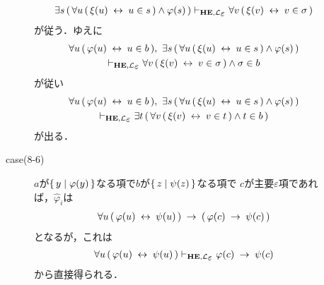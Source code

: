 \begin{metaprf}
\begin{description}
\begin{description}
\begin{align}
							\exists s\, (\, \forall u\, (\, \xi(u) \lrarrow u \in s\, ) \wedge \varphi(s)\, ) 
							\provable{\mbox{{\bf HE}},\lang{\varepsilon}} \forall v\, (\, \xi(v) \lrarrow v \in \sigma\, )
						\end{align}
						が従う．ゆえに
						\begin{align}
							\begin{gathered}
								\forall u\, (\, \varphi(u) \lrarrow u \in b\, ),\ 
								\exists s\, (\, \forall u\, (\, \xi(u) \lrarrow u \in s\, ) \wedge \varphi(s)\, ) \\
								\provable{\mbox{{\bf HE}},\lang{\varepsilon}} \forall v\, (\, \xi(v) \lrarrow v \in \sigma\, ) \wedge \sigma \in b
							\end{gathered}
						\end{align}
						が従い
						\begin{align}
							\begin{gathered}
								\forall u\, (\, \varphi(u) \lrarrow u \in b\, ),\ 
								\exists s\, (\, \forall u\, (\, \xi(u) \lrarrow u \in s\, ) \wedge \varphi(s)\, ) \\
								\provable{\mbox{{\bf HE}},\lang{\varepsilon}} \exists t\, (\, \forall v\, (\, \xi(v) \lrarrow v \in t\, ) \wedge t \in b\, )
							\end{gathered}
						\end{align}
						が出る．
						
					\item[case(8-6)] $a$が$\{\, y \mid \varphi(y)\, \}$なる項で$b$が$\{\, z \mid \psi(z)\, \}$なる項で
						$c$が主要$\varepsilon$項であれば，$\widehat{\varphi}_{i}$は
						\begin{align}
							\forall u\, (\, \varphi(u) \hspace{0.25em}\leftrightarrow\hspace{0.25em} \psi(u)\, ) \hspace{0.25em}\rightarrow\hspace{0.25em} (\, \varphi(c) \hspace{0.25em}\rightarrow\hspace{0.25em} \psi(c)\, )
						\end{align}
						となるが，これは
						\begin{align}
							\forall u\, (\, \varphi(u) \lrarrow \psi(u)\, ) 
							\provable{\mbox{{\bf HE}},\lang{\varepsilon}} 
							\varphi(c) \rarrow \psi(c)
						\end{align}
						から直接得られる．
						

\end{description}
\end{description}
\end{metaprf}

